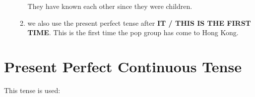 \begin{enumerate}
\begin{enumerate}
                \newline
                They have known each other since they were children.
                \newline
            \item we also use the present perfect tense after
                \textbf{IT / THIS IS THE FIRST TIME}.
                \newline
                \newline
                This is the first time the pop group has come to Hong Kong.
                \newline
                \newline
        \end{enumerate}
\end{enumerate}

\newpage
\section{Present Perfect Continuous Tense}
This tense is used:
